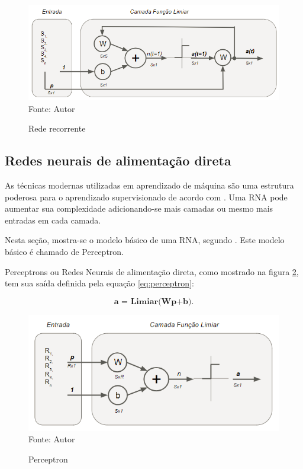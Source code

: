 \documentclass[
	12pt,				%
    oneside,			%
	a4paper,			%
	english,			%
	french,				%
	spanish,			%
	brazil,				%
	]{abntex2}
\begin{document}
\begin{figure}[H]
    \centering
    \caption{Rede recorrente}
    \includegraphics[scale=0.75]{Rede_recorrente1}\\
    Fonte: Autor\hfill
    \label{fig:rederecorrente}
\end{figure}


\subsection{Redes neurais de alimentação direta}

As técnicas modernas utilizadas em aprendizado de máquina são uma estrutura poderosa para o aprendizado supervisionado de acordo com . Uma RNA pode aumentar sua complexidade adicionando-se mais camadas ou mesmo mais entradas em cada camada. 

Nesta seção, mostra-se o modelo básico de uma RNA, segundo . Este modelo básico é chamado de Perceptron. 


Perceptrons ou Redes Neurais de alimentação direta, como mostrado na figura \ref{fig:perceptron},  tem sua saída definida pela equação \ref{eq:perceptron}:

 \begin{equation}
    \textbf{a  = Limiar(Wp+b)}.
    \label{eq:perceptron}
  \end{equation} 
  
\begin{figure}[H]
    \centering
    \caption{Perceptron}
    \includegraphics[scale=1]{perceptron1}\\
    Fonte: Autor\hfill
    \label{fig:perceptron}
\end{figure}
\end{document}
